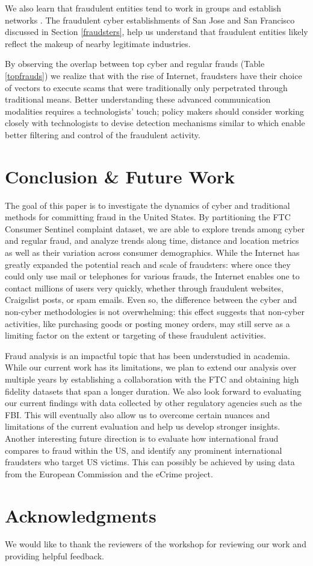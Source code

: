 \documentclass[conference]{IEEEtran}
\begin{document}
We also learn that fraudulent entities tend to work in groups and establish networks \cite{buffalodebt2}. The fraudulent cyber establishments of San Jose and San Francisco discussed in Section \ref{fraudsters}, help us understand that fraudulent entities likely reflect the makeup of nearby legitimate industries.  

By observing the overlap between top cyber and regular frauds (Table \ref{topfrauds}) we realize that with the rise of Internet, fraudsters have their choice of vectors to execute scams that were traditionally only perpetrated through traditional means. Better understanding these advanced communication modalities requires a technologists' touch;  policy makers should consider working closely with technologists to devise detection mechanisms similar to \cite{brause1999neural, moreau1997detection} which enable better filtering and control of the fraudulent activity.

\section{Conclusion \& Future Work}\label{conclusion}

The goal of this paper is to investigate the dynamics of cyber and traditional methods for committing fraud in the United States. By partitioning the FTC Consumer Sentinel complaint dataset, we are able to explore trends among cyber and regular fraud, and analyze trends along time, distance and location metrics as well as their variation across consumer demographics. While the Internet has greatly expanded the potential reach and scale of fraudsters: where once they could only use mail or telephones for various frauds, the Internet enables one to contact millions of users very quickly, whether through fraudulent websites, Craigslist posts, or spam emails. Even so, the difference between the cyber and non-cyber methodologies is not overwhelming: this effect suggests that non-cyber activities, like purchasing goods or posting money orders, may still serve as a limiting factor on the extent or targeting of these fraudulent activities. 

Fraud analysis is an impactful topic that has been understudied in academia. While our current work has its limitations, we plan to extend our analysis over multiple years by establishing a collaboration with the FTC and obtaining high fidelity datasets that span a longer duration. We also look forward to evaluating our current findings with data collected by other regulatory agencies such as the FBI. This will eventually also allow us to overcome certain nuances and limitations of the current evaluation and help us develop stronger insights. Another interesting future direction is to evaluate how international fraud compares to fraud within the US, and identify any prominent international fraudsters who target US victims. This can possibly be achieved by using data from the European Commission and the eCrime project.


\section{Acknowledgments}\label{Acknowledgments}

We would like to thank the reviewers of the workshop for
reviewing our work and providing helpful feedback.




 


\end{document}
